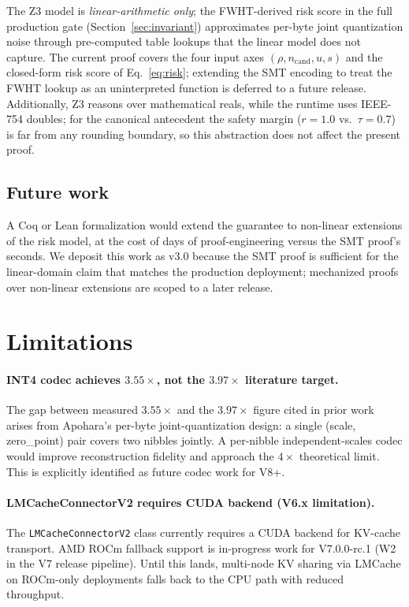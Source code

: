 \documentclass[10pt,twocolumn]{article}
\newcommand{\Cand}{n_{\text{cand}}}
\newcommand{\Reuse}{u}
\newcommand{\Shuf}{s}
\newcommand{\code}[1]{\texttt{\small #1}}
\begin{document}
The Z3 model is \emph{linear-arithmetic only}; the
FWHT-derived risk score in the full production gate
(Section~\ref{sec:invariant}) approximates per-byte joint
quantization noise through pre-computed table lookups that the
linear model does not capture. The current proof covers the four
input axes $(\rho, \Cand, \Reuse, \Shuf)$ and the closed-form
risk score of Eq.~\ref{eq:risk}; extending the SMT encoding to
treat the FWHT lookup as an uninterpreted function is deferred to
a future release. Additionally, Z3 reasons over mathematical reals,
while the runtime uses IEEE-754 doubles; for the canonical
antecedent the safety margin
($r = 1.0$ vs.\ $\tau = 0.7$) is far from any rounding boundary,
so this abstraction does not affect the present proof.

\subsection{Future work}
\label{ssec:z3-future}

A Coq or Lean formalization would extend the guarantee to
non-linear extensions of the risk model, at the cost of days of
proof-engineering versus the SMT proof's seconds. We deposit this
work as v3.0 because the SMT proof is sufficient for the
linear-domain claim that matches the production deployment;
mechanized proofs over non-linear extensions are scoped to a
later release.

\section{Limitations}
\label{sec:limitations}

\paragraph{INT4 codec achieves $3.55\times$, not the $3.97\times$ literature target.}
The gap between measured $3.55\times$ and the $3.97\times$ figure cited
in prior work \cite{rotatekv} arises from Apohara's per-byte
joint-quantization design: a single (scale, zero\_point) pair covers two
nibbles jointly. A per-nibble independent-scales codec would improve
reconstruction fidelity and approach the $4\times$ theoretical limit.
This is explicitly identified as future codec work for V8+.

\paragraph{LMCacheConnectorV2 requires CUDA backend (V6.x limitation).}
The \code{LMCacheConnectorV2} class currently requires a CUDA backend
for KV-cache transport. AMD ROCm fallback support is in-progress work
for V7.0.0-rc.1 (W2 in the V7 release pipeline). Until this lands,
multi-node KV sharing via LMCache on ROCm-only deployments falls back
to the CPU path with reduced throughput.
\end{document}
